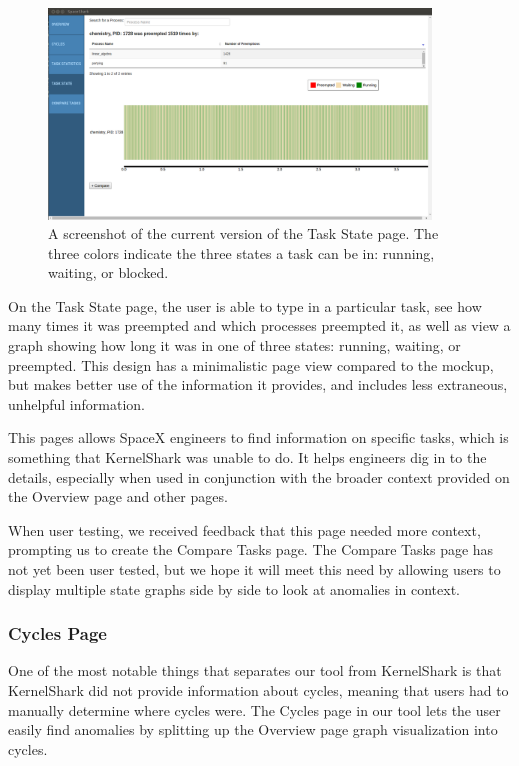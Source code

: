 \documentclass{hmcclinic}
\begin{document}
\begin{figure}[H]
\begin{center}
\includegraphics[width=4in]{task-state-page.png}
\caption{A screenshot of the current version of the Task State page. The three
colors indicate the three states a task can be in: running, waiting, or blocked.}
\end{center}
\end{figure}

On the Task State page, the user is able to type in a particular task, see
how many times it was preempted and which processes preempted it, as well as
view a graph showing how long it was in one of three states: running, waiting,
or preempted. This design has a minimalistic page view compared to the mockup,
but makes better use of the information it provides, and includes less
extraneous, unhelpful information.

This pages allows SpaceX engineers to find information on specific tasks, which
is something that KernelShark was unable to do. It helps engineers dig in to the
details, especially when used in conjunction with the broader context provided
on the Overview page and other pages.

When user testing, we received feedback that this page needed more context,
prompting us to create the Compare Tasks page. The Compare Tasks page has not
yet been user tested, but we hope it will meet this need by allowing users to
display multiple state graphs side by side to look at anomalies in context.

\subsubsection{Cycles Page}

One of the most notable things that separates our tool from KernelShark is that
KernelShark did not provide information about cycles, meaning that users had to
manually determine where cycles were.
The Cycles page in our tool lets the user easily find anomalies by splitting up
the Overview page graph visualization into cycles.
\end{document}
